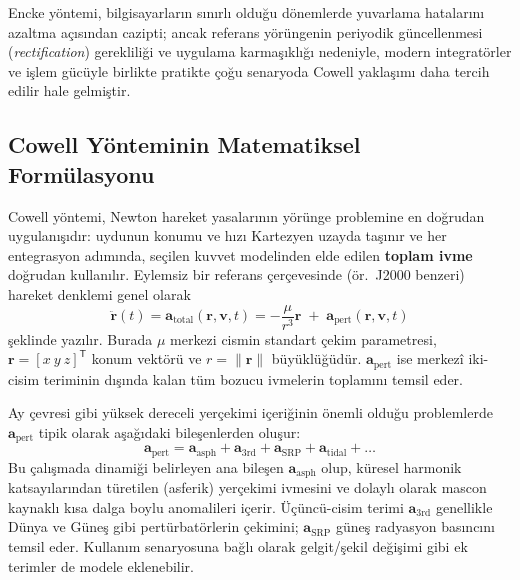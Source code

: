 \smallskip
Encke yöntemi, bilgisayarların sınırlı olduğu dönemlerde yuvarlama hatalarını azaltma açısından cazipti; ancak referans
yörüngenin periyodik güncellenmesi (\emph{rectification}) gerekliliği ve uygulama karmaşıklığı nedeniyle, modern integratörler ve işlem gücüyle birlikte pratikte çoğu senaryoda Cowell yaklaşımı daha tercih edilir hale gelmiştir.





\subsection{Cowell Yönteminin Matematiksel Formülasyonu}
\label{subsec:cowell_math}

Cowell yöntemi, Newton hareket yasalarının yörünge problemine en doğrudan uygulanışıdır:
uydunun konumu ve hızı Kartezyen uzayda taşınır ve her entegrasyon adımında, seçilen kuvvet modelinden elde edilen
\textbf{toplam ivme} doğrudan kullanılır. Eylemsiz bir referans çerçevesinde (ör.\ J2000 benzeri) hareket denklemi
genel olarak
\begin{equation}
\label{eq:cowell_basic}
\ddot{\mathbf r}(t)=\mathbf a_{\text{total}}(\mathbf r,\mathbf v,t)
= -\frac{\mu}{r^{3}}\mathbf r \;+\;\mathbf a_{\text{pert}}(\mathbf r,\mathbf v,t)
\end{equation}
şeklinde yazılır. Burada $\mu$ merkezi cismin standart çekim parametresi, $\mathbf r=[x\ y\ z]^{\mathsf T}$ konum vektörü
ve $r=\|\mathbf r\|$ büyüklüğüdür. $\mathbf a_{\text{pert}}$ ise merkezî iki-cisim teriminin dışında kalan tüm bozucu
ivmelerin toplamını temsil eder.

Ay çevresi gibi yüksek dereceli yerçekimi içeriğinin önemli olduğu problemlerde $\mathbf a_{\text{pert}}$ tipik olarak
aşağıdaki bileşenlerden oluşur:
\begin{equation}
\label{eq:apert_components}
\mathbf a_{\text{pert}}
= \mathbf a_{\text{asph}}
+ \mathbf a_{\text{3rd}}
+ \mathbf a_{\text{SRP}}
+ \mathbf a_{\text{tidal}}
+ \dots
\end{equation}
Bu çalışmada dinamiği belirleyen ana bileşen $\mathbf a_{\text{asph}}$ olup, küresel harmonik katsayılarından türetilen
(asferik) yerçekimi ivmesini ve dolaylı olarak mascon kaynaklı kısa dalga boylu anomalileri içerir. Üçüncü-cisim terimi
$\mathbf a_{\text{3rd}}$ genellikle Dünya ve Güneş gibi pertürbatörlerin çekimini; $\mathbf a_{\text{SRP}}$ güneş radyasyon
basıncını temsil eder. Kullanım senaryosuna bağlı olarak gelgit/şekil değişimi gibi ek terimler de modele eklenebilir.

